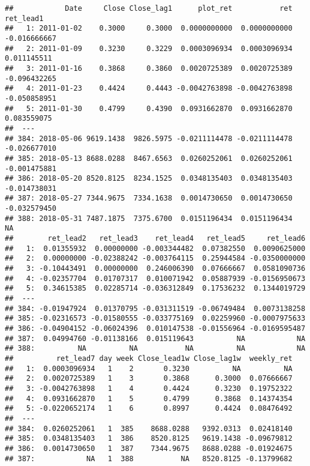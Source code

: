 \documentclass[
]{article}
\begin{document}
\begin{verbatim}
##            Date     Close Close_lag1      plot_ret           ret    ret_lead1
##   1: 2011-01-02    0.3000     0.3000  0.0000000000  0.0000000000 -0.016666667
##   2: 2011-01-09    0.3230     0.3229  0.0003096934  0.0003096934  0.011145511
##   3: 2011-01-16    0.3868     0.3860  0.0020725389  0.0020725389 -0.096432265
##   4: 2011-01-23    0.4424     0.4443 -0.0042763898 -0.0042763898 -0.050858951
##   5: 2011-01-30    0.4799     0.4390  0.0931662870  0.0931662870  0.083559075
##  ---                                                                         
## 384: 2018-05-06 9619.1438  9826.5975 -0.0211114478 -0.0211114478 -0.026677010
## 385: 2018-05-13 8688.0288  8467.6563  0.0260252061  0.0260252061 -0.001475881
## 386: 2018-05-20 8520.8125  8234.1525  0.0348135403  0.0348135403 -0.014738031
## 387: 2018-05-27 7344.9675  7334.1638  0.0014730650  0.0014730650 -0.032579450
## 388: 2018-05-31 7487.1875  7375.6700  0.0151196434  0.0151196434           NA
##        ret_lead2   ret_lead3    ret_lead4   ret_lead5     ret_lead6
##   1:  0.01355932  0.00000000 -0.003344482  0.07382550  0.0090625000
##   2:  0.00000000 -0.02388242 -0.003764115  0.25944584 -0.0350000000
##   3: -0.10443491  0.00000000  0.246006390  0.07666667  0.0581090736
##   4: -0.02357704  0.01707317  0.010071942  0.05887939 -0.0156950673
##   5:  0.34615385  0.02285714 -0.036312849  0.17536232  0.1344019729
##  ---                                                               
## 384: -0.01947924  0.01370795 -0.031311519 -0.06749484  0.0073138258
## 385: -0.02316573 -0.01580555 -0.033775169  0.02259960 -0.0007975633
## 386: -0.04904152 -0.06024396  0.010147538 -0.01556964 -0.0169595487
## 387:  0.04994760 -0.01138166  0.015119643          NA            NA
## 388:          NA          NA           NA          NA            NA
##          ret_lead7 day week Close_lead1w Close_lag1w  weekly_ret
##   1:  0.0003096934   1    2       0.3230          NA          NA
##   2:  0.0020725389   1    3       0.3868      0.3000  0.07666667
##   3: -0.0042763898   1    4       0.4424      0.3230  0.19752322
##   4:  0.0931662870   1    5       0.4799      0.3868  0.14374354
##   5: -0.0220652174   1    6       0.8997      0.4424  0.08476492
##  ---                                                            
## 384:  0.0260252061   1  385    8688.0288   9392.0313  0.02418140
## 385:  0.0348135403   1  386    8520.8125   9619.1438 -0.09679812
## 386:  0.0014730650   1  387    7344.9675   8688.0288 -0.01924675
## 387:            NA   1  388           NA   8520.8125 -0.13799682

\end{verbatim}
\end{document}
